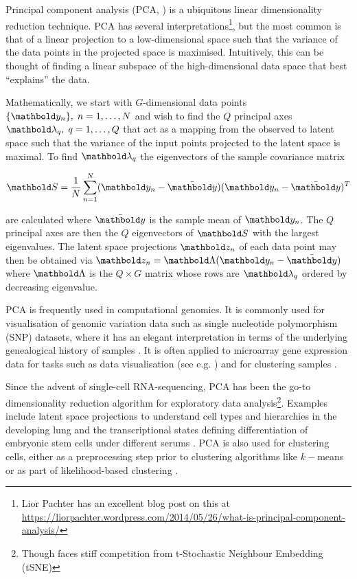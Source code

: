 Principal component analysis (PCA, \cite{jolliffe2002principal}) is a ubiquitous linear dimensionality reduction technique. PCA has several interpretations\footnote{Lior Pachter has an excellent blog post on this at \url{https://liorpachter.wordpress.com/2014/05/26/what-is-principal-component-analysis/}}, but the most common is that of a linear projection to a low-dimensional space such that the variance of the data points in the projected space is maximised. Intuitively, this can be thought of finding a linear subspace of the high-dimensional data space that best ``explains''
the data.

Mathematically, we start with $G$-dimensional data points $\{\mby_n\}, \; n = 1, \ldots, N$ and wish to find the $Q$ principal axes $\mblambda_q, \; q = 1, \ldots, Q$ that act as a mapping from the observed to latent space such that the variance of the input points projected to the latent space is maximal. To find $\mblambda_q$ the eigenvectors of the sample covariance matrix

\begin{equation}
  \mbS = \frac{1}{N}\sum_{n = 1}^N (\mby_n - \bar{\mby}) (\mby_n - \bar{\mby})^T
\end{equation}

are calculated where $\bar{\mby}$ is the sample mean of $\mby_n$. The $Q$ principal axes are then the $Q$ eigenvectors of $\mbS$ with the largest eigenvalues. The latent space projections $\mbz_n$ of each data point may then be obtained via $\mbz_n = \mbLambda (\mby_n - \bar{\mby})$ where $\mbLambda$ is the $Q \times G$ matrix whose rows are $\mblambda_q$ ordered by decreasing eigenvalue.

PCA is frequently used in computational genomics. It is commonly used for visualisation of genomic variation data such as single nucleotide polymorphism (SNP) datasets, where it has an elegant interpretation in terms of the underlying genealogical history of samples \cite{mcvean2009genealogical}.
It is often applied to microarray gene expression data for tasks such as data visualisation (see e.g. \cite{ringner2008principal}) and for clustering samples \cite{yeung2001principal}.

Since the advent of single-cell RNA-sequencing, PCA has been the go-to dimensionality reduction algorithm for exploratory data analysis\footnote{Though faces stiff competition from t-Stochastic Neighbour Embedding (tSNE)}. Examples include latent space projections to understand cell types and hierarchies in the developing lung \cite{treutlein2014reconstructing} and the transcriptional states defining differentiation of embryonic stem cells under different serums \cite{kolodziejczyk2015single}. PCA is also used for clustering cells, either as a preprocessing step prior to clustering algorithms like $k-$means or as part of likelihood-based clustering \cite{yau2016pcareduce}.

